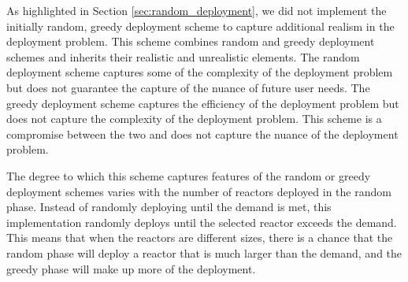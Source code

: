 As highlighted in Section \ref{sec:random_deployment}, we did not implement the
initially random, greedy deployment scheme to capture additional realism in the
deployment problem. This scheme combines random and greedy deployment schemes
and inherits their realistic and unrealistic elements. The random deployment
scheme captures some of the complexity of the deployment problem but does not
guarantee the capture of the nuance of future user needs. The greedy deployment
scheme captures the efficiency of the deployment problem but does not capture
the complexity of the deployment problem. This scheme is a compromise between
the two and does not capture the nuance of the deployment problem.

The degree to which this scheme captures features of the random or greedy
deployment schemes varies with the number of reactors deployed in the random
phase. Instead of randomly deploying until the demand is met, this
implementation randomly deploys until the selected reactor exceeds the demand.
This means that when the reactors are different sizes, there is a chance that
the random phase will deploy a reactor that is much larger than the demand, and
the greedy phase will make up more of the deployment.